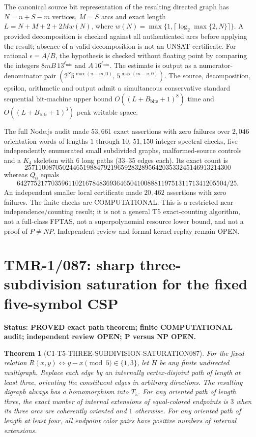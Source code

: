 \documentclass[11pt]{article}
\newtheorem{theorem}{Theorem}
\begin{document}
The canonical source bit representation of the resulting directed
graph has $N=n+S-m$ vertices, $M=S$ arcs and exact length
$L=N+M+2+2Mw(N)$, where
$w(N)=\max\{1,\lceil\log_2\max\{2,N\}\rceil\}$.
A provided decomposition is checked against all authenticated arcs
before applying the result; absence of a valid decomposition is not
an UNSAT certificate. For rational $\epsilon=A/B$, the hypothesis
is checked without floating point by comparing the integers
$8mB\,13^{\ell_{\min}}$ and $A\,16^{\ell_{\min}}$.
The estimate is output as a numerator-denominator pair
$(2^S5^{\max(n-m,0)},\,5^{\max(m-n,0)})$.
The source, decomposition, epsilon, arithmetic and output admit
a simultaneous conservative standard sequential bit-machine
upper bound $O((L+B_{\mathrm{bits}}+1)^8)$ time and
$O((L+B_{\mathrm{bits}}+1)^3)$ peak writable space.

The full Node.js audit made $53{,}661$ exact assertions with zero
failures over $2{,}046$ orientation words of lengths $1$ through
$10$, $51{,}150$ integer spectral checks, five independently
enumerated small subdivided graphs, malformed-source controls and
a $K_4$ skeleton with 6 long paths (33--35 edges each).
Its exact count is
\[
257110087050244651988479219659283289564203533245146913214300
\]
whereas $Q_0$ equals
\[
6427752177035961102167848369364650410088811975131171341205504/25.
\]
An independent smaller local certificate made $20{,}462$ assertions
with zero failures. The finite checks are COMPUTATIONAL. This is
a restricted near-independence/counting result; it is not a general
T5 exact-counting algorithm, not a full-class FPTAS, not a
superpolynomial resource lower bound, and not a proof of
$P\ne NP$. Independent review and formal kernel replay remain OPEN.

\section{TMR-1/087: sharp three-subdivision saturation for the fixed five-symbol CSP}
\noindent\textbf{Status: PROVED exact path theorem; finite COMPUTATIONAL audit; independent review OPEN; P versus NP OPEN.}

\begin{theorem}[C1-T5-THREE-SUBDIVISION-SATURATION087]
For the fixed relation \(R(x,y)\iff y-x\pmod 5\in\{1,3\}\),
let \(H\) be any finite undirected multigraph. Replace each edge by
an internally vertex-disjoint path of length at least three,
orienting the constituent edges in arbitrary directions. The resulting
digraph always has a homomorphism into \(T_5\).
For any oriented path of length three, the exact number of internal
extensions of equal-colored endpoints is \(3\) when its three arcs
are coherently oriented and \(1\) otherwise. For any oriented
path of length at least four, \emph{all} endpoint color pairs have
positive numbers of internal extensions.
\end{theorem}
\end{document}
